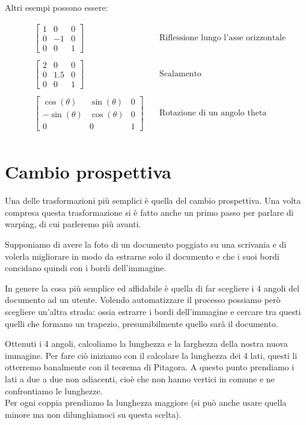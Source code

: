 \newpage \noindent 
Altri esempi possono essere:

\begin{align*}
&\begin{bmatrix}
1&0&0\\
0&-1&0\\
0&0&1
\end{bmatrix}&~&
\text{Riflessione lungo l'asse orizzontale}\\
\\
&\begin{bmatrix}
2&0&0\\
0&1.5&0\\
0&0&1
\end{bmatrix}&~&
\text{Scalamento}\\
\\
&\begin{bmatrix}
\cos(\theta )&\sin(\theta )&0\\
-\sin(\theta )&\cos(\theta )&0\\
0&0&1
\end{bmatrix}&~&
\text{Rotazione di un angolo theta}\\
\end{align*}



\section{Cambio prospettiva}
Una delle trasformazioni più semplici è quella del cambio prospettiva. Una volta compresa questa trasformazione si è fatto anche un primo passo per parlare di warping, di cui parleremo più avanti.

\vspace{1em} \noindent
Supponiamo di avere la foto di un documento poggiato su una scrivania e di volerla migliorare in modo da estrarne solo il documento e che i suoi bordi concidano quindi con i bordi dell'immagine.

\vspace{1em} \noindent
In genere la cosa più semplice ed affidabile è quella di far scegliere i 4 angoli del documento ad un utente. Volendo automatizzare il processo possiamo però scegliere un'altra strada: ossia estrarre i bordi dell'immagine e cercare tra questi quelli che formano un trapezio, presumibilmente quello sarà il documento.

\vspace{1em} \noindent
Ottenuti i 4 angoli, calcoliamo la lunghezza e la larghezza della nostra nuova immagine. Per fare ciò iniziamo con il calcolare la lunghezza dei 4 lati, questi li otterremo banalmente con il teorema di Pitagora. A questo punto prendiamo i lati a due a due non adiacenti, cioè che non hanno vertici in comune e ne confrontiamo le lunghezze.\\
Per ogni coppia prendiamo la lunghezza maggiore (si può anche usare quella minore ma non dilunghiamoci su questa scelta).

